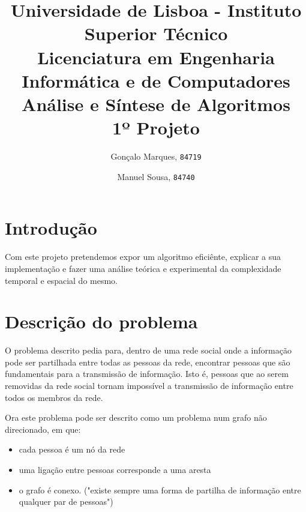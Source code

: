 \documentclass{scrartcl}
\begin{document}

\title{
	\textnormal{
	\LARGE Universidade de Lisboa - Instituto Superior Técnico\\
	\Large Licenciatura em Engenharia Informática e de Computadores\\
	\Large Análise e Síntese de Algoritmos
\\}
	\LARGE1º Projeto
	\vspace{-1ex}
	}
\author{Gonçalo Marques,
	\texttt{84719}
	\and
	Manuel Sousa,
	\texttt{84740}
}
\date{	\vspace{-1ex}
		\vspace{-4ex}
	}
\maketitle
\section*{Introdução}
Com este projeto pretendemos expor um algoritmo eficiênte, explicar a sua implementação e fazer uma análise teórica e experimental da complexidade temporal e espacial do mesmo.

\section*{Descrição do problema}
O problema descrito pedia para, dentro de uma rede social onde a informação pode ser partilhada entre todas as pessoas da rede, encontrar pessoas que são fundamentais para a transmissão de informação. Isto é, pessoas que ao serem removidas da rede social tornam impossível a transmissão de informação entre todos os membros da rede.

Ora este problema pode ser descrito como um problema num grafo não direcionado, em que:
\begin{itemize}
\setlength\itemsep{-0.5ex}
\item cada pessoa é um nó da rede
\item uma ligação entre pessoas corresponde a uma aresta
\item o grafo é conexo. ("existe sempre uma forma de partilha de informação entre qualquer par de pessoas")
\end{itemize}
\end{document}
